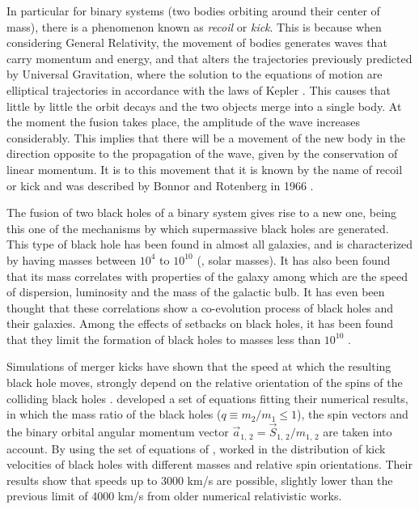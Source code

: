 	In particular for binary systems (two bodies orbiting around their center of mass), there is a phenomenon known as \textit{recoil} or \textit{kick}. This is because when considering General Relativity, the movement of bodies generates waves that carry momentum and energy, and that alters the trajectories previously predicted by Universal Gravitation, where the solution to the equations of motion are elliptical trajectories in accordance with the laws of Kepler \cite{hughes2005black, hoyng2006gravitational, brugmann2018fundamentals}. This causes that little by little the orbit decays and the two objects merge into a single body. At the moment the fusion takes place, the amplitude of the wave increases considerably. This implies that there will be a movement of the new body in the direction opposite to the propagation of the wave, given by the conservation of linear momentum. It is to this movement that it is known by the name of recoil or kick and was described by Bonnor and Rotenberg in 1966 \cite{hughes2005black, bonnor1966gravitational}.
	
	The fusion of two black holes of a binary system gives rise to a new one, being this one of the mechanisms by which supermassive black holes are generated. This type of black hole has been found in almost all galaxies, and is characterized by having masses between $10^4$ \sm to $10^{10}$ \sm (\sm, solar masses). It has also been found that its mass correlates with properties of the galaxy among which are the speed of dispersion, luminosity and the mass of the galactic bulb. It has even been thought that these correlations show a co-evolution process of black holes and their galaxies. Among the effects of setbacks on black holes, it has been found that they limit the formation of black holes to masses less than $10^{10}$ \sm \cite{choksi2017recoiling}.
	
	Simulations of merger kicks have shown that the speed at which the resulting black hole moves, strongly depend on the relative orientation of the spins of the colliding black holes \cite{baker2008modeling}. \citeauthor{baker2008modeling} developed a set of equations fitting their numerical results, in which the mass ratio of the black holes ($q \equiv m_2 / m_1 \leq 1$), the spin vectors and the binary orbital angular momentum vector $\vec{a}_\text{1, 2} = \vec{S}_\text{1, 2}/m_\text{1, 2}$ are taken into account. By using the set of equations of \citeauthor{baker2008modeling}, \citeauthor{tanaka2009assembly} worked in the distribution of kick velocities of black holes with different masses and relative spin orientations. Their results show that speeds up to 3000 km/s are possible, slightly lower than the previous limit of 4000 km/s from older numerical relativistic works.
	
